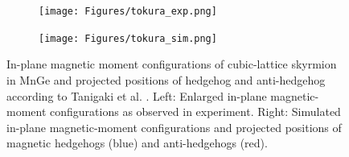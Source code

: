 \documentclass [a4paper, 12pt]{article}
\begin{document}
\begin{figure}[h]
	\centering
	\begin{subfigure}{.5\textwidth}
		  \centering
		  \texttt{[image: Figures/tokura\_exp.png]}
		  \label{fig:sub1}
	\end{subfigure}%
	\begin{subfigure}{.5\textwidth}
		  \centering
		  \texttt{[image: Figures/tokura\_sim.png]}
                  \label{fig:sub2}
	\end{subfigure}
	\caption{In-plane magnetic moment configurations of cubic-lattice skyrmion 
		in MnGe and projected positions of hedgehog and anti-hedgehog according to
	        Tanigaki et al. \cite{tanigaki_real-space_2015}.
		Left: Enlarged in-plane magnetic-moment configurations as observed in experiment.
		Right: Simulated in-plane magnetic-moment configurations and projected
		positions of magnetic hedgehogs (blue) and anti-hedgehogs (red).}
		
	\label{fig:tokura_results}
\end{figure}
\end{document}
